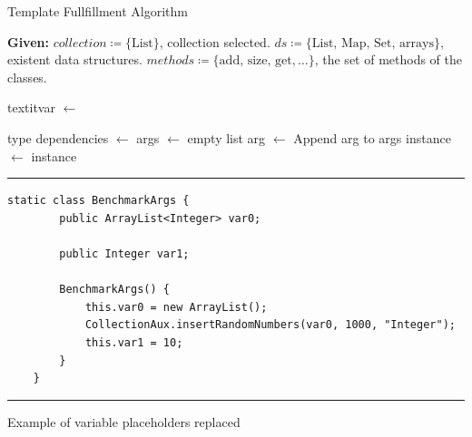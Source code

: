 \begin{algorithm}[H]
\caption{Template Fullfillment Algorithm}
\label{alg:test_generation}
\begin{algorithmic}[1]
    \Statex \textbf{Given:}
    \Statex \hspace{\algorithmicindent} $collection \coloneqq \{\text{List}\}$, collection selected.
    \Statex \hspace{\algorithmicindent} $ds \coloneqq \{\text{List, Map, Set, arrays}\}$, existent data structures.
    \Statex \hspace{\algorithmicindent} $methods \coloneqq \{\text{add, size, get}, \dots\}$, the set of methods of the classes.

            \State textit{var} $\gets$ 
                \State {}
            \EndIf
        \EndFor
    \EndFor
\EndProcedure

\vspace{1em} 

        \State \Return type
    \Else
        \State dependencies $\gets$ 
        \State args $\gets$ empty list
            \State arg $\gets$ 
            \State Append arg to args
        \EndFor
        \State instance $\gets$  
        \State \Return instance
    \EndIf
\EndProcedure

\end{algorithmic}
\end{algorithm}

\begin{listing}[H]
\noindent\rule{\linewidth}{0.4pt}
\begin{verbatim}
static class BenchmarkArgs {
        public ArrayList<Integer> var0;

        public Integer var1;

        BenchmarkArgs() {
            this.var0 = new ArrayList();
            CollectionAux.insertRandomNumbers(var0, 1000, "Integer");
            this.var1 = 10;
        }
    }
\end{verbatim}
\noindent\rule{\linewidth}{0.4pt}
\caption{Example of variable placeholders replaced}            
\label{lst:var_placeholders_replaced}
\end{listing}



